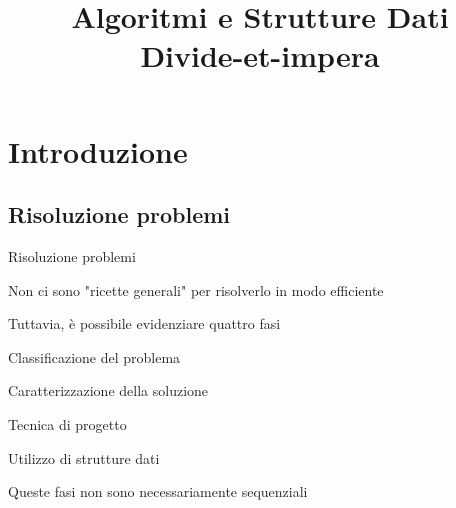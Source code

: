 
\title[ASD - Divide-et-impera]{\textbf{Algoritmi e Strutture Dati}\\[24pt]Divide-et-impera}

\renewcommand{\Primo}{\mathit{start}\xspace}
\renewcommand{\Ultimo}{\mathit{end}\xspace}

\usepackage{tikz}
\usepackage{xmpmulti}
\usepackage{listings}


\graphicspath{{figs/12/}}



\FrameTitle{}

\FrameContent



\section{Introduzione}

\subsection{Risoluzione problemi}


\begin{frame}{Risoluzione problemi}

\BIL
\item Non ci sono "ricette generali" per risolverlo in modo efficiente
\item Tuttavia, è possibile evidenziare quattro fasi
\BI
\item \alert{Classificazione del problema}
\item \alert{Caratterizzazione della soluzione}
\item \alert{Tecnica di progetto}
\item \alert{Utilizzo di strutture dati}
\EI
\item Queste fasi non sono necessariamente sequenziali
\EIL

\end{frame}


